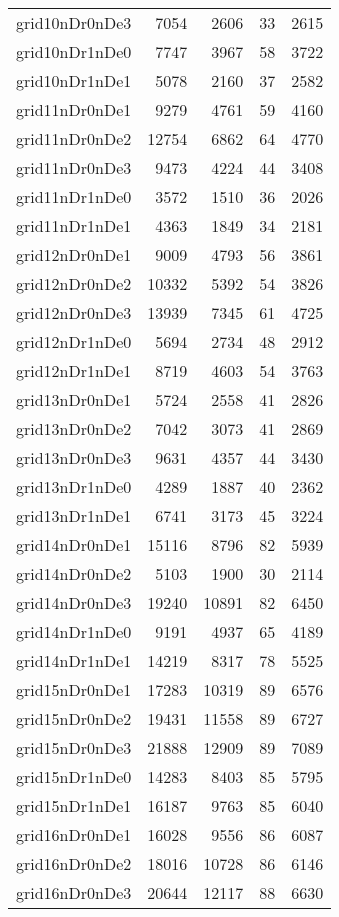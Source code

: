 \begin{longtable}{lrrrr}
grid10nDr0nDe3 & 7054 & 2606 & 33 & 2615 \\
grid10nDr1nDe0 & 7747 & 3967 & 58 & 3722 \\
grid10nDr1nDe1 & 5078 & 2160 & 37 & 2582 \\
grid11nDr0nDe1 & 9279 & 4761 & 59 & 4160 \\
grid11nDr0nDe2 & 12754 & 6862 & 64 & 4770 \\
grid11nDr0nDe3 & 9473 & 4224 & 44 & 3408 \\
grid11nDr1nDe0 & 3572 & 1510 & 36 & 2026 \\
grid11nDr1nDe1 & 4363 & 1849 & 34 & 2181 \\
grid12nDr0nDe1 & 9009 & 4793 & 56 & 3861 \\
grid12nDr0nDe2 & 10332 & 5392 & 54 & 3826 \\
grid12nDr0nDe3 & 13939 & 7345 & 61 & 4725 \\
grid12nDr1nDe0 & 5694 & 2734 & 48 & 2912 \\
grid12nDr1nDe1 & 8719 & 4603 & 54 & 3763 \\
grid13nDr0nDe1 & 5724 & 2558 & 41 & 2826 \\
grid13nDr0nDe2 & 7042 & 3073 & 41 & 2869 \\
grid13nDr0nDe3 & 9631 & 4357 & 44 & 3430 \\
grid13nDr1nDe0 & 4289 & 1887 & 40 & 2362 \\
grid13nDr1nDe1 & 6741 & 3173 & 45 & 3224 \\
grid14nDr0nDe1 & 15116 & 8796 & 82 & 5939 \\
grid14nDr0nDe2 & 5103 & 1900 & 30 & 2114 \\
grid14nDr0nDe3 & 19240 & 10891 & 82 & 6450 \\
grid14nDr1nDe0 & 9191 & 4937 & 65 & 4189 \\
grid14nDr1nDe1 & 14219 & 8317 & 78 & 5525 \\
grid15nDr0nDe1 & 17283 & 10319 & 89 & 6576 \\
grid15nDr0nDe2 & 19431 & 11558 & 89 & 6727 \\
grid15nDr0nDe3 & 21888 & 12909 & 89 & 7089 \\
grid15nDr1nDe0 & 14283 & 8403 & 85 & 5795 \\
grid15nDr1nDe1 & 16187 & 9763 & 85 & 6040 \\
grid16nDr0nDe1 & 16028 & 9556 & 86 & 6087 \\
grid16nDr0nDe2 & 18016 & 10728 & 86 & 6146 \\
grid16nDr0nDe3 & 20644 & 12117 & 88 & 6630 \\

\end{longtable}
